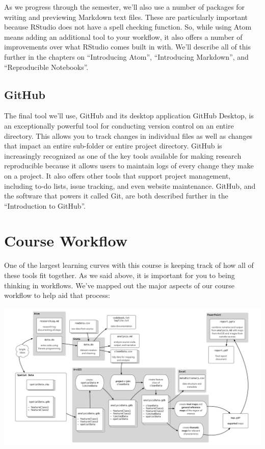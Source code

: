 \documentclass[]{book}
\theoremstyle{definition}
\theoremstyle{definition}
\theoremstyle{definition}
\theoremstyle{remark}
\begin{document}
As we progress through the semester, we'll also use a number of packages
for writing and previewing Markdown text files. These are particularly
important because RStudio does not have a spell checking function. So,
while using Atom means adding an additional tool to your workflow, it
also offers a number of improvements over what RStudio comes built in
with. We'll describe all of this further in the chapters on
``Introducing Atom'', ``Introducing Markdown'', and ``Reproducible
Notebooks''.

\subsection{GitHub}\label{github}

The final tool we'll use, GitHub and its desktop application GitHub
Desktop, is an exceptionally powerful tool for conducting version
control on an entire directory. This allows you to track changes in
individual files as well as changes that impact an entire sub-folder or
entire project directory. GitHub is increasingly recognized as one of
the key tools available for making research reproducible because it
allows users to maintain logs of every change they make on a project. It
also offers other tools that support project management, including to-do
lists, issue tracking, and even website maintenance. GitHub, and the
software that powers it called Git, are both described further in the
``Introduction to GitHub''.

\section{Course Workflow}\label{course-workflow}

One of the largest learning curves with this course is keeping track of
how all of these tools fit together. As we said above, it is important
for you to being thinking in workflows. We've mapped out the major
aspects of our course workflow to help aid that process:

\includegraphics[width=1\linewidth]{images/gisFlow1}
\end{document}
